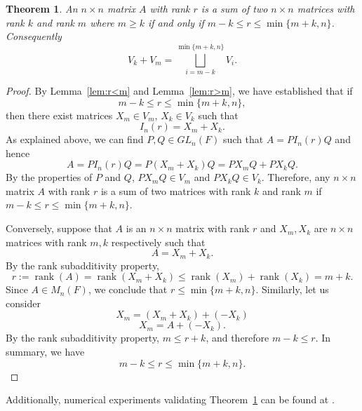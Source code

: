 \documentclass[12pt, a4paper]{amsart}
\newtheorem{thm}{Theorem}[section]
\theoremstyle{definition}
\newtheorem{expl}[thm]{Example}
\numberwithin{equation}{section}
\newcommand{\F}{\mathbb{F}}
\DeclareMathOperator{\rank}{rank}
\begin{document}
\begin{thm} \label{thm:sum_rank_sets}
    An $n \times n$ matrix $A$ with rank $r$ is a sum of two $n \times n$ matrices with rank $k$ and rank $m$ where $m \geq k$ if and only if $m-k \leq r \leq \min\{m+k, n\}$. Consequently 
    \[ V_k + V_m = \bigsqcup_{i=m-k}^{\min\{m+k, n\}} V_i.\]
\end{thm}
\begin{proof}
    By Lemma~\ref{lem:r<m} and Lemma~\ref{lem:r>m}, we have established that if
    \[m-k \leq r \leq \min\{m+k, n\},\]
    then there exist matrices $X_m \in V_m$, $X_k \in V_k$ such that
    \[I_n(r) = X_m + X_k.\]
    As explained above, we can find $P, Q \in GL_n(F)$ such that $A=PI_n(r)Q$ and hence 
    \[A = PI_n(r)Q = P (X_m + X_k)Q = PX_mQ + PX_kQ.\]
    By the properties of $P$ and $Q$, $PX_mQ \in V_m$ and $PX_kQ \in V_k$.
    Therefore, any $n \times n$ matrix $A$ with rank $r$ is a sum of two matrices with rank $k$ and rank $m$ if $m-k \leq r \leq \min\{m+k, n\}$. 
    
    
    Conversely, suppose that $A$ is an $n \times n$ matrix with rank $r$ and $X_m,X_k$ are $n \times n$ matrices with rank $m, k$ respectively such that
    \[A = X_m + X_k.\]
    By the rank subadditivity property, 
    \[r:= \rank(A) = \rank(X_m+X_k) \leq \rank(X_m)+\rank(X_k) = m+k .\]
    Since $A \in M_n(F)$, we conclude that $r \leq \min \{m+k, n\}.$ Similarly, let us consider
    \[X_m = (X_m + X_k) + (-X_k)\]
    \[X_m = A + (-X_k).\]
    By the rank subadditivity property, $m \leq r + k$, and therefore $m-k \leq r.$ In summary, we have 
    \[m-k \leq r \leq \min\{m+k, n\}.\]
\end{proof}
Additionally, numerical experiments validating Theorem~\ref{thm:sum_rank_sets} can be found at \cite{githubrepo}.
\end{document}
